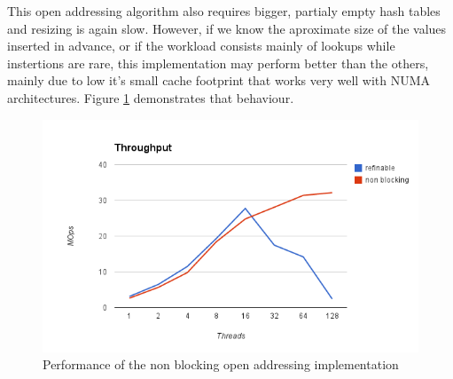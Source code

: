 This open addressing algorithm also requires bigger, partialy empty hash tables and resizing is again slow. However, if we know the aproximate size of the values inserted in advance, or if the workload consists mainly of lookups while instertions are rare, this implementation may perform better than the others,  mainly due to low it's small cache footprint that works very well with NUMA architectures. Figure \ref{hashes_non_blocking_perf} demonstrates that behaviour.

\begin{figure}
 \centering
  \includegraphics[scale=0.5]{hashes_non_blocking_perf.png}
\caption{Performance of the non blocking open addressing implementation}
\label{hashes_non_blocking_perf}
\end{figure}
